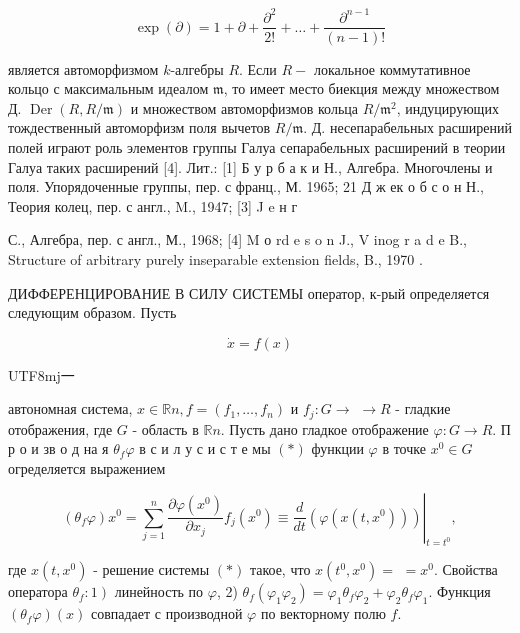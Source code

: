 \documentclass[10pt]{article}
\begin{document}
\[

\exp (\partial)=1+\partial+\frac{\partial^{2}}{2 !}+\ldots+\frac{\partial^{n-1}}{(n-1) !}

\]



является автоморфизмом $k$-алгебры $R$. Если $R-$ локальное коммутативное кольцо с максимальным идеалом $\mathfrak{m}$, то имеет место биекция между множеством Д. $\operatorname{Der}(R, R / \mathfrak{m})$ и множеством автоморфизмов кольца $R / \mathfrak{m}^{2}$, индуцирующих тождественный автоморфизм поля вычетов $R / \mathfrak{m}$. Д. несепарабельных расширений полей играют роль элементов группы Галуа сепарабельных расширений в теории Галуа таких расширений [4]. Лит.: [1] Б у р б а к и Н., Алгебра. Многочлены и поля. Упорядоченные группы, пер. с франц., М. 1965; 21 Д ж ек о б с о н Н., Теория колец, пер. с англ., M., 1947; [3] J e н г

С., Алгебра, пер. с англ., М., 1968; [4] M о rd e s o n J., V inog r a d e B., Structure of arbitrary purely inseparable extension fields, B., 1970 .



ДИФФЕРЕНЦИРОВАНИЕ В СИЛУ СИСТЕМЫ оператор, к-рый определяется следующим образом. Пусть



\[

\dot{x}=f(x)

\]



\begin{CJK}{UTF8}{mj}一\end{CJK}автономная система, $x \in \mathbb{R} n, f=\left(f_{1}, \ldots, f_{n}\right)$ и $f_{j}: G \rightarrow$ $\rightarrow R$ - гладкие отображения, где $G$ - область в $\mathbb{R} n$. Пусть дано гладкое отображение $\varphi: G \rightarrow R$. П р о и зв о д на я $\theta_{f} \varphi$ в с и л у с и с т е мы $(*)$ функции $\varphi$ в точке $x^{0} \in G$ огределяется выражением



\[

\left(\theta_{f} \varphi\right) x^{0}=\left.\sum_{j=1}^{n} \frac{\partial \varphi\left(x^{0}\right)}{\partial x_{j}} f_{j}\left(x^{0}\right) \equiv \frac{d}{d t}\left(\varphi\left(x\left(t, x^{0}\right)\right)\right)\right|_{t=t^{0}},

\]



где $x\left(t, x^{0}\right)$ - решение системы $(*)$ такое, что $x\left(t^{0}, x^{0}\right)=$ $=x^{0}$. Свойства оператора $\left.\theta_{f}: 1\right)$ линейность по $\varphi$, 2) $\theta_{f}\left(\varphi_{1} \varphi_{2}\right)=\varphi_{1} \theta_{f} \varphi_{2}+\varphi_{2} \theta_{f} \varphi_{1}$. Функция $\left(\theta_{f} \varphi\right)(x)$ совпадает с производной $\varphi$ по векторному полю $f$.
\end{document}
